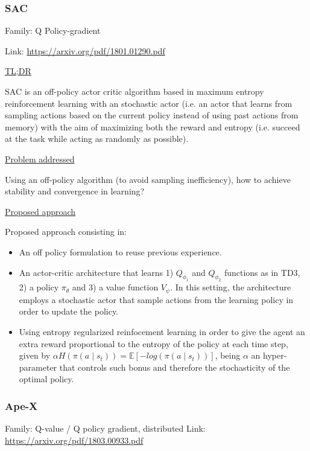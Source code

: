 \documentclass[12pt, english]{article}
\begin{document}
\subsubsection{SAC}
\label{SAC}

Family: Q Policy-gradient

Link: \url{https://arxiv.org/pdf/1801.01290.pdf}

\underline{TL;DR}

SAC \cite{haarnoja_soft_2018} is an off-policy actor critic algorithm based in maximum entropy reinforcement learning with an stochastic actor (i.e. an actor that learns from sampling actions based on the current policy instead of using past actions from memory) with the aim of maximizing both the reward and entropy (i.e. succeed at the task while acting as randomly as possible).

\underline{Problem addressed}

Using an off-policy algorithm (to avoid sampling inefficiency), how to achieve stability and convergence in learning?

\underline{Proposed approach}

Proposed approach consisting in:

\begin{itemize}
  \item An off policy formulation to reuse previous experience.
  \item An actor-critic architecture that learns 1) $Q_{\phi_1}$ and $Q_{\phi_2}$ functions as in TD3, 2) a policy $\pi_\theta$ and 3) a value function $V_\psi$. In this setting, the architecture employs a stochastic actor that sample actions from the learning policy in order to update the policy.
  \item Using entropy regularized reinfocement learning in order to give the agent an extra reward proportional to the entropy of the policy at each time step, given by $\alpha H(\pi(a \mid s_t)) = \mathbb{E}[-log(\pi(a \mid s_t))]$, being $\alpha$ an hyper-parameter that controls such bonus and therefore the stochasticity of the optimal policy.
\end{itemize}


\subsubsection{Ape-X}
\label{Ape-X}

Family: Q-value / Q policy gradient, distributed
Link: \url{https://arxiv.org/pdf/1803.00933.pdf}
\end{document}
